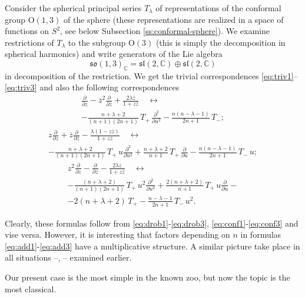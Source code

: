 \documentclass[10pt,a4paper]{amsart}
\newcounter{sec}
\renewcommand\O{\mathrm{O}}
\def\frl{\mathfrak l}
\def\fro{\mathfrak o}
\def\frs{\mathfrak s}
\def\C {{\mathbb C }}
\def\ov{\overline}
\begin{document}
Consider the spherical principal series $T_\lambda$ of representations
of the
conformal group $\O(1,3)$ of the sphere (these representations
are realized in a space
of functions on $S^2$, see below Subsection \ref{ss:conformal-sphere}).
We examine restrictions of $T_\lambda$
 to the subgroup $\O(3)$ (this is simply the decomposition
 in spherical harmonics) and write generators
of the Lie algebra
$$
\frs\fro(1,3)_\C=\frs\frl(2,\C)\oplus \frs\frl(2,\C)
$$
 in  decomposition of the restriction. We get the trivial
correspondences \eqref{eq:triv1}--\eqref{eq:triv3}
and also the following correspondences  
 \begin{multline}
\frac{\partial}{\partial z} - \ov z^2 \frac{\partial}{\partial \ov z}
+\frac{2\lambda \ov z}{1+z \ov z} \quad \longleftrightarrow
\\
 -\frac{n +\lambda+ 2}{(n+1)(2 n+1)}\,
T_+ \,\frac{\partial^2}{\partial u^2}  - 
 \frac{n (n -  \lambda - 1)}{2 n+1}\, T_-;
 \label{eq:add1} 
 \end{multline}
 \begin{multline}
z\frac{\partial}{\partial z} + \ov z \frac{\partial}{\partial \ov z}
-\frac{\lambda (1-z \ov z)}{1+z \ov z} \quad \longleftrightarrow
\\ 
- \frac{n+\lambda+2}{(n+1) (2 n+1)}\,
 T_+\, u \frac{\partial^2}{\partial u^2}+ 
 \frac{n+\lambda+2}{n+1}\, T_+ \,  \frac{\partial}{\partial u}
 -\frac{n(n-\lambda-1) }{2 n+1}\, T_- \,u;
\label{eq:add2} 
 \end{multline}
\begin{multline}
z^2\frac{\partial}{\partial z} -  \frac{\partial}{\partial \ov z}
-\frac{2\lambda z}{1+z \ov z} \quad \longleftrightarrow
\\
-\frac{(n+\lambda+2) }{(n+1) (2 n+1)}\, T_+ \, u^2\frac{\partial^2}{\partial u^2}
+\frac{2 (n+\lambda+2)}{n+1}\, T_+ \,u  \frac{\partial}{\partial u}
-
\\-2 (n+\lambda+2)\, T_+
-\frac{n-\lambda-1}{2 n+1} \,T_-\, u^2.
\label{eq:add3}
\end{multline} 

Clearly, these formulas follow from \eqref{eq:drob1}-\eqref{eq:drob3},
\eqref{eq:conf1}-\eqref{eq:conf3} and vise versa. However, it is interesting
that factors depending on $n$ in formulas \eqref{eq:add1}-\eqref{eq:add3}
have a multiplicative structure. A similar picture take place in all  situations
\cite{Mol1}--\cite{Mol3}, \cite{Ner1}--\cite{Ner-Lob} examined earlier.

Our present case is the most simple in the known zoo, but now
 the topic is the most classical. 
\end{document}

